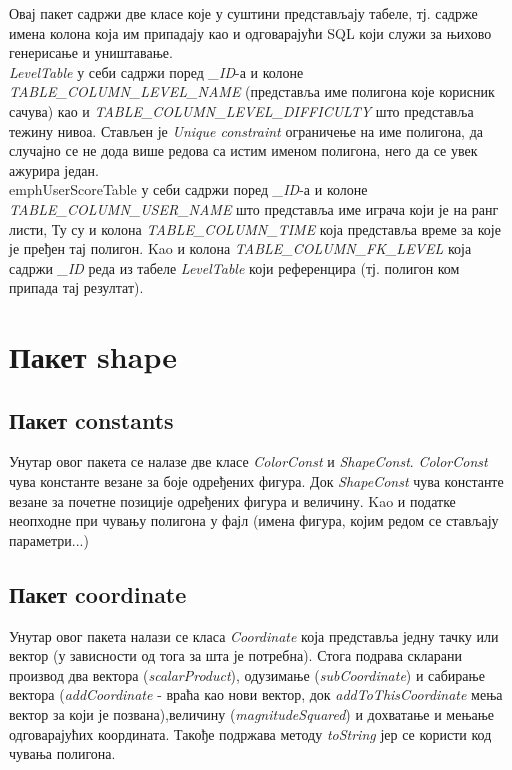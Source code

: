 Овај пакет садржи две класе које у суштини представљају табеле, тј. садрже имена колона која им припадају као и одговарајући SQL који служи за њихово генерисање и уништавање. 
\\ \indent
 \emph{LevelTable} у себи садржи поред \emph{\_ID}-а и колоне \emph{TABLE\_COLUMN\_LEVEL\_NAME } (представља име полигона које корисник сачува) као и \emph{TABLE\_COLUMN\_LEVEL\_DIFFICULTY} што представља тежину нивоа. Стављен је \emph{Unique constraint} ограничење на име полигона, да случајно се не дода више редова са истим именом полигона, него да се увек ажурира један. \
\\ \indent 	
 emph{UserScoreTable } у себи садржи поред \emph{\_ID}-а и колоне \emph{TABLE\_COLUMN\_USER\_NAME } што представља име играча који је на ранг листи, Ту су и колона \emph{TABLE\_COLUMN\_TIME}  која представља време за које је пређен тај полигон. Kao и колона \emph{TABLE\_COLUMN\_FK\_LEVEL} која садржи \emph{\_ID} реда из табеле \emph{LevelTable} који референцира (тј. полигон ком припада тај резултат).
 
\section{Пакет shape}
\subsection{Пакет constants}
Унутар овог пакета се налазе две класе \emph{ColorConst} и \emph{ShapeConst}. \emph{ColorConst} чува константе везане за боје одређених фигура. Док \emph{ShapeConst}  чува константе везане за почетне позиције одређених фигура и величину. Kao и податке неопходне при чувању полигона у фајл (имена фигура, којим редом се стављају параметри...)
\subsection{Пакет coordinate}
Унутар овог пакета налази се класа \emph{Coordinate} која представља једну тачку или вектор (у зависности од тога за шта је потребна). Стога подрава скларани производ два вектора (\emph{scalarProduct}), одузимање (\emph{subCoordinate}) и сабирање вектора (\emph{addCoordinate} - враћа као нови вектор, док \emph{addToThisCoordinate} мења вектор за који је позвана),величину (\emph{magnitudeSquared}) и дохватање и мењање одговарајућих координата. Такође подржава методу \emph{toString} јер се користи код чувања полигона. 
